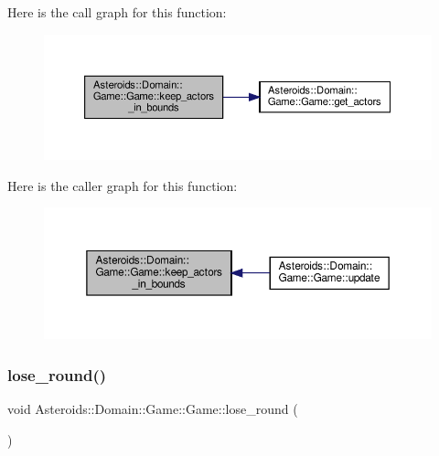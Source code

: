 Here is the call graph for this function\+:\nopagebreak
\begin{figure}[H]
\begin{center}
\leavevmode
\includegraphics[width=350pt]{classAsteroids_1_1Domain_1_1Game_1_1Game_a594494581cf464eafb2842cb98387819_cgraph}
\end{center}
\end{figure}
Here is the caller graph for this function\+:\nopagebreak
\begin{figure}[H]
\begin{center}
\leavevmode
\includegraphics[width=350pt]{classAsteroids_1_1Domain_1_1Game_1_1Game_a594494581cf464eafb2842cb98387819_icgraph}
\end{center}
\end{figure}
\mbox{\label{classAsteroids_1_1Domain_1_1Game_1_1Game_aca6a4c9568d4bffcd9b1ff331c338abb}} 
\subsubsection{\texorpdfstring{lose\+\_\+round()}{lose\_round()}}
{\footnotesize\ttfamily void Asteroids\+::\+Domain\+::\+Game\+::\+Game\+::lose\+\_\+round (\begin{DoxyParamCaption}{ }\end{DoxyParamCaption})\hspace{0.3cm}{\ttfamily [private]}}



